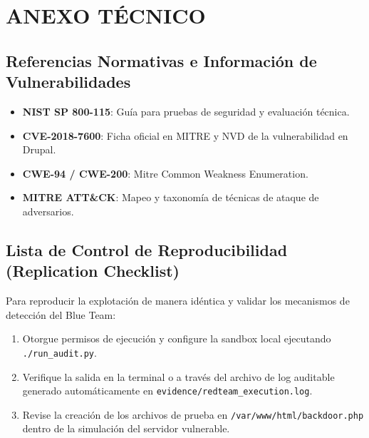 \documentclass[11pt,a4paper]{article}
\begin{document}
\section{ANEXO TÉCNICO}

\subsection{Referencias Normativas e Información de Vulnerabilidades}
\begin{itemize}
    \item \textbf{NIST SP 800-115}: Guía para pruebas de seguridad y evaluación técnica.
    \item \textbf{CVE-2018-7600}: Ficha oficial en MITRE y NVD de la vulnerabilidad en Drupal.
    \item \textbf{CWE-94 / CWE-200}: Mitre Common Weakness Enumeration.
    \item \textbf{MITRE ATT\&CK}: Mapeo y taxonomía de técnicas de ataque de adversarios.
\end{itemize}

\subsection{Lista de Control de Reproducibilidad (Replication Checklist)}
Para reproducir la explotación de manera idéntica y validar los mecanismos de detección del Blue Team:
\begin{enumerate}
    \item Otorgue permisos de ejecución y configure la sandbox local ejecutando \texttt{./run\_audit.py}.
    \item Verifique la salida en la terminal o a través del archivo de log auditable generado automáticamente en \texttt{evidence/redteam\_execution.log}.
    \item Revise la creación de los archivos de prueba en \texttt{/var/www/html/backdoor.php} dentro de la simulación del servidor vulnerable.
\end{enumerate}
\end{document}
